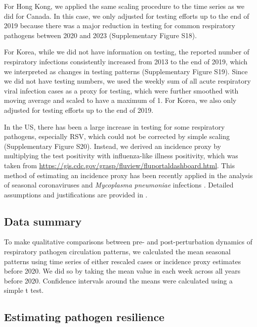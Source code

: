 \documentclass[12pt]{article}
\begin{document}
For Hong Kong, we applied the same scaling procedure to the time series as we did for Canada.
In this case, we only adjusted for testing efforts up to the end of 2019 because there was a major reduction in testing for common respiratory pathogens between 2020 and 2023 (Supplementary Figure S18).

For Korea, while we did not have information on testing, the reported number of respiratory infections consistently increased from 2013 to the end of 2019, which we interpreted as changes in testing patterns (Supplementary Figure S19).
Since we did not have testing numbers, we used the weekly sum of all acute respiratory viral infection cases as a proxy for testing, which were further smoothed with moving average and scaled to have a maximum of 1.
For Korea, we also only adjusted for testing efforts up to the end of 2019.

In the US, there has been a large increase in testing for some respiratory pathogens, especially RSV, which could not be corrected by simple scaling (Supplementary Figure S20).
Instead, we derived an incidence proxy by multiplying the test positivity with influenza-like illness positivity, which was taken from \url{https://gis.cdc.gov/grasp/fluview/fluportaldashboard.html}.
This method of estimating an incidence proxy has been recently applied in the analysis of seasonal coronaviruses \citep{kissler2020projecting} and \textit{Mycoplasma pneumoniae} infections \citep{park2024predicting}.
Detailed assumptions and justifications are provided in \citep{goldstein2011predicting}.

\subsection*{Data summary}

To make qualitative comparisons between pre- and post-perturbation dynamics of respiratory pathogen circulation patterns, we calculated the mean seasonal patterns using time series of either rescaled cases or incidence proxy estimates before 2020.
We did so by taking the mean value in each week across all years before 2020.
Confidence intervals around the means were calculated using a simple t test.

\subsection*{Estimating pathogen resilience}
\end{document}
